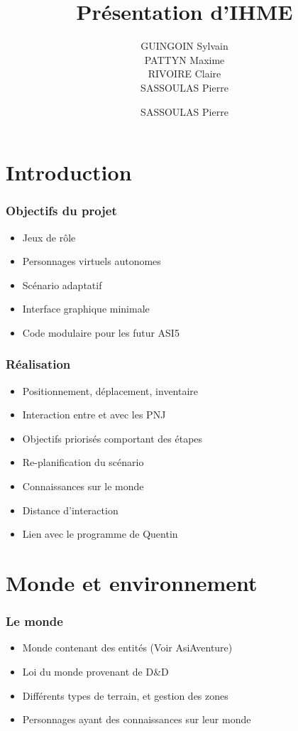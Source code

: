\documentclass{beamer}
\title{Présentation d'IHME}
\author{GUINGOIN Sylvain \\PATTYN Maxime \\RIVOIRE Claire \\SASSOULAS Pierre}
\newcommand{\cmark}{\ding{51}}
\newcommand{\xmark}{\ding{55}}
\begin{document}
\frame{\titlepage}
\author{}
\frame{\tableofcontents}

\author{SASSOULAS Pierre}
\section{Introduction}
\begin{frame}
  \frametitle{Objectifs du projet}
    \begin{itemize}
        \item Jeux de rôle
        \item Personnages virtuels autonomes
        \item Scénario adaptatif 
        \item Interface graphique minimale
        \item Code modulaire pour les futur ASI5
    \end{itemize} 
\end{frame}

\begin{frame}
  \frametitle{Réalisation}
    \begin{itemize}
        \item Positionnement, déplacement, inventaire \only<2>{\textcolor{vertFleche}{\LARGE \cmark{}}  \textit{\small} }
        \item Interaction entre et avec les PNJ \only<2>{\textcolor{vertFleche}{\LARGE \cmark{}} \textit{\small }}
        \item Objectifs priorisés comportant des étapes \only<2>{\textcolor{vertFleche}{\LARGE \cmark{}} \textit{\small }}
        \item Re-planification du scénario \only<2>{\textcolor{vertFleche}{\LARGE \cmark{}} \textit{\small }}
        \item Connaissances sur le monde \only<2>{\textcolor{vertFleche}{\LARGE \cmark{}} \textit{\small }}
        \item Distance d'interaction  \only<2>{\textcolor{red}{\LARGE \xmark{}} \textit{\small }}
        \item Lien avec le programme de Quentin \only<2>{\textcolor{red}{\LARGE \xmark{}} \textit{\small }}
    \end{itemize} 
\end{frame}

\section{Monde et environnement}
\begin{frame}
    \frametitle{Le monde}
    \begin{itemize}
        \item Monde contenant des entités (Voir AsiAventure)
        \item Loi du monde provenant de D\&D
        \item Différents types de terrain, et gestion des zones
        \item Personnages ayant des connaissances sur leur monde
    \end{itemize} 
\end{frame}
\end{document}
